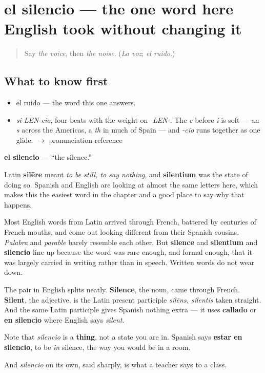 \section[el silencio]{el silencio — the one word here English took without changing it}

\label{lesson:ES-C333-silencio}



\begin{quote}
Say \emph{the voice}, then \emph{the noise}. (\emph{La voz}; \emph{el ruido}.)
\end{quote}

\subsection*{What to know first}
\begin{itemize}
\raggedright
  \item el ruido — the word this one answers.
\end{itemize}

\begin{sounds}
\begin{itemize}
\raggedright
  \item \emph{si-LEN-cio}, four beats with the weight on \emph{-LEN-}. The \emph{c} before \emph{i} is soft — an \emph{s} across the Americas, a \emph{th} in much of Spain — and \emph{-cio} runs together as one glide. $\to$ pronunciation reference
\end{itemize}
\end{sounds}

\begin{cousinweb}
\textbf{el silencio} — \textquotedblleft{}the silence.\textquotedblright{}

Latin \textbf{silēre} meant \emph{to be still, to say nothing}, and \textbf{silentium} was the state of doing so. Spanish and English are looking at almost the same letters here, which makes this the easiest word in the chapter and a good place to say why that happens.

Most English words from Latin arrived through French, battered by centuries of French mouths, and come out looking different from their Spanish cousins. \emph{Palabra} and \emph{parable} barely resemble each other. But \textbf{silence} and \textbf{silentium} and \textbf{silencio} line up because the word was rare enough, and formal enough, that it was largely carried in writing rather than in speech. Written words do not wear down.

The pair in English splits neatly. \textbf{Silence}, the noun, came through French. \textbf{Silent}, the adjective, is the Latin present participle \emph{silēns, silentis} taken straight. And the same Latin participle gives Spanish nothing extra — it uses \textbf{callado} or \textbf{en silencio} where English says \emph{silent}.

Note that \emph{silencio} is a \textbf{thing}, not a state you are in. Spanish says \textbf{estar en silencio}, to be \emph{in} silence, the way you would be in a room.

And \emph{silencio} on its own, said sharply, is what a teacher says to a class.
\end{cousinweb}

